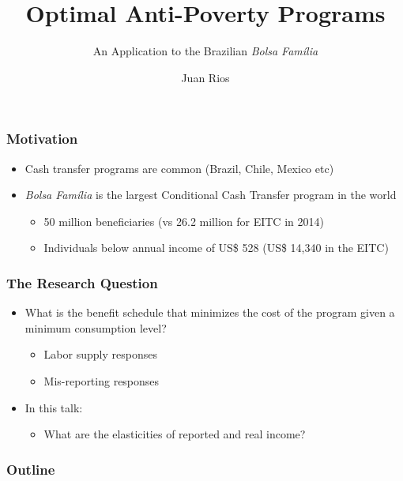 \documentclass[xcolor=pdftex,dvipsnames,table]{beamer}
\begin{document}
\title{Optimal Anti-Poverty Programs}
\subtitle{An Application to the Brazilian \textit{Bolsa Fam\'ilia}}
\author{Juan Rios}

\maketitle

\begin{frame}
 \frametitle{Motivation}
\begin{itemize}
\item Cash transfer programs are common (Brazil, Chile, Mexico etc)
\item \textit{Bolsa Fam\'ilia} is the largest Conditional Cash Transfer program in the world
\begin{itemize}
\item 50 million beneficiaries (vs 26.2 million for EITC in 2014)
\item Individuals below annual income of US\$ 528 (US\$ 14,340 in the EITC)
\end{itemize}
\end{itemize}
\end{frame}

\begin{frame}[label=question]
 \frametitle{The Research Question}
\begin{itemize}
\item What is the benefit schedule that minimizes the cost of the program given a minimum consumption level?
\begin{itemize}
\item Labor supply responses
\item Mis-reporting responses
\end{itemize}
\item In this talk:
\begin{itemize}
\item What are the elasticities of reported and real income?
\end{itemize}
\end{itemize}
\hyperlink{literature}{}
\end{frame}

\begin{frame}
    \frametitle{Outline}
    \tableofcontents[pausesections]
\end{frame}
\end{document}
